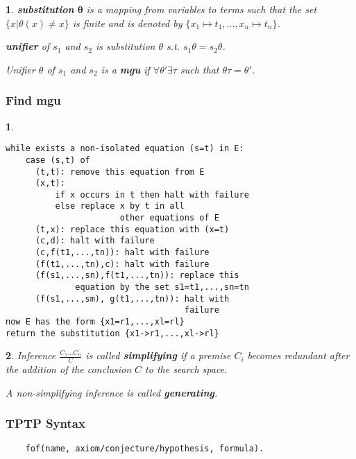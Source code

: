 \documentclass[9pt]{extarticle}
\theoremstyle{theoremstyle}
\newtheorem*{green}{}
\newtheorem*{red}{}
\begin{document}
\begin{multicols}{3}
\begin{minipage}[t]{.30\textwidth}
\begin{green}
\textbf{substitution} $\mathbf{\theta}$ is a mapping from variables to terms such that the set $\{x | \theta(x) \not= x\}$ is finite and is denoted by $\{x_1 \mapsto t_1, ..., x_n \mapsto t_n\}$.

\textbf{unifier} of $s_1$ and $s_2$ is substitution $\theta$ s.t. $s_1\theta = s_2\theta$.

Unifier $\theta$ of $s_1$ and $s_2$ is a \textbf{mgu} if $\forall\theta' \exists\tau$ such that $\theta\tau = \theta'$.
\end{green}

\subsubsection*{Find mgu}
\begin{red}
\begin{verbatim}
while exists a non-isolated equation (s=t) in E:
    case (s,t) of
      (t,t): remove this equation from E
      (x,t):
          if x occurs in t then halt with failure
          else replace x by t in all
                       other equations of E
      (t,x): replace this equation with (x=t)
      (c,d): halt with failure
      (c,f(t1,...,tn)): halt with failure
      (f(t1,...,tn),c): halt with failure
      (f(s1,...,sn),f(t1,...,tn)): replace this
              equation by the set s1=t1,...,sn=tn
      (f(s1,...,sm), g(t1,...,tn)): halt with
                                    failure
now E has the form {x1=r1,...,xl=rl}
return the substitution {x1->r1,...,xl->rl}
\end{verbatim}
\end{red}

\begin{green}
Inference $\frac{C_1 ... C_n}{C}$ is called \textbf{simplifying} if a premise $C_i$ becomes redundant after the addition of the conclusion $C$ to the search space.
	
A non-simplifying inference is called \textbf{generating}.
\end{green}

\subsubsection*{TPTP Syntax}	
\begin{verbatim}
	fof(name, axiom/conjecture/hypothesis, formula).
\end{verbatim}


\end{minipage}
\end{multicols}
\end{document}
